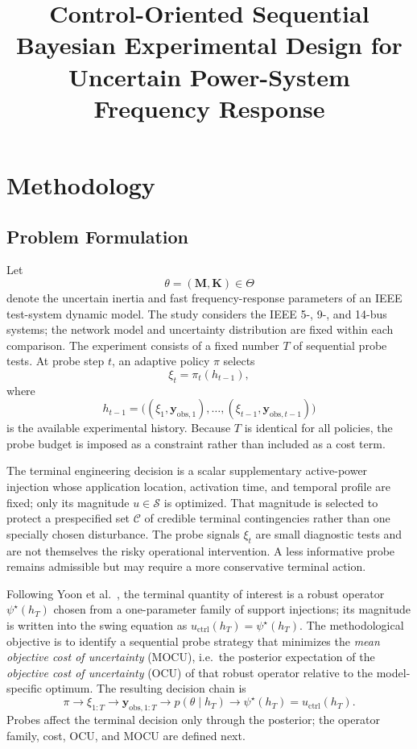 \documentclass[11pt]{article}
\title{Control-Oriented Sequential Bayesian Experimental Design for
Uncertain Power-System Frequency Response}
\author{}
\date{}
\begin{document}
\maketitle

\section{Methodology}

\subsection{Problem Formulation}

Let
\[
\theta=(\mathbf M,\mathbf K)\in\Theta
\]
denote the uncertain inertia and fast frequency-response parameters of an
IEEE test-system dynamic model. The study considers the IEEE 5-, 9-, and
14-bus systems; the network model and uncertainty distribution are fixed
within each comparison. The experiment consists of a fixed number \(T\) of
sequential probe tests. At probe step \(t\), an adaptive policy \(\pi\) selects
\[
\xi_t=\pi_t(h_{t-1}),
\]
where
\[
h_{t-1}
=
\bigl(
(\xi_1,\mathbf y_{\mathrm{obs},1}),
\ldots,
(\xi_{t-1},\mathbf y_{\mathrm{obs},t-1})
\bigr)
\]
is the available experimental history. Because \(T\) is identical for all policies, the probe budget is imposed as a constraint rather than included as a cost term.

The terminal engineering decision is a scalar supplementary active-power
injection whose application location, activation time, and temporal profile are
fixed; only its magnitude \(u\in\mathcal S\) is optimized. That magnitude is
selected to protect a prespecified set \(\mathcal C\) of credible terminal
contingencies rather than one specially chosen disturbance. The probe signals
\(\xi_t\) are small diagnostic tests and are not themselves the risky
operational intervention. A less informative probe remains admissible but may
require a more conservative terminal action.

Following Yoon et al.~\cite{yoon2013}, the terminal quantity of interest is a
robust operator \(\psi^\star(h_T)\) chosen from a one-parameter family of support
injections; its magnitude is written into the swing equation as
\(u_{\mathrm{ctrl}}(h_T)=\psi^\star(h_T)\). The methodological objective is to
identify a sequential probe strategy that minimizes the \emph{mean objective
cost of uncertainty} (MOCU), i.e.\ the posterior expectation of the
\emph{objective cost of uncertainty} (OCU) of that robust operator relative to
the model-specific optimum. The resulting decision chain is
\[
\boxed{
\pi
\longrightarrow
\xi_{1:T}
\longrightarrow
\mathbf y_{\mathrm{obs},1:T}
\longrightarrow
p(\theta\mid h_T)
\longrightarrow
\psi^\star(h_T)
=
u_{\mathrm{ctrl}}(h_T).
}
\]
Probes affect the terminal decision only through the posterior; the operator
family, cost, OCU, and MOCU are defined next.
\end{document}
